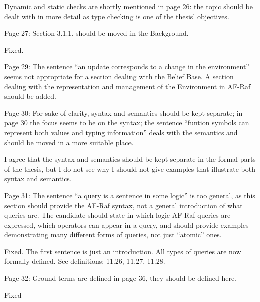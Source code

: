 \documentclass{article}
\newcommand{\todo}[1]{[\textcolor{red}{TODO}: #1]}
\newenvironment{them}{\noindent\begingroup\color{blue}}{\endgroup\par}
\begin{document}
\begin{them}

Dynamic and static checks are shortly mentioned in page 26: the topic should be
dealt with in more detail as type checking is one of the thesis' objectives.

\end{them}
\todo{}

\begin{them}

Page 27:
Section 3.1.1. should be moved in the Background.
\end{them}
Fixed. 

\begin{them}

Page 29:
The sentence “an update corresponds to a change in the environment” seems not
appropriate for a section dealing with the Belief Base. A section dealing with
the representation and management of the Environment in AF-Raf should be added.

\end{them}
\todo{}

\begin{them}

Page 30:
For sake of clarity, syntax and semantics should be kept separate; in page 30
the focus seems to be on the syntax; the sentence “funtion symbols can
represent both values and typing information” deals with the semantics and
should be moved in a more suitable place.

\end{them}
I agree that the syntax and semantics should be kept separate in the formal
parts of the thesis, but I do not see why I should not give examples that
illustrate both syntax and semantics.

\begin{them}

Page 31:
The sentence “a query is a sentence in some logic” is too general, as this
section should provide the AF-Raf syntax, not a general introduction of what
queries are. The candidate should state in which logic AF-Raf queries are
expressed, which operators can appear in a query, and should provide examples
demonstrating many different forms of queries, not just “atomic” ones.

\end{them}
Fixed. The first sentence is just an introduction. All types of queries are now
formally defined. See definitions: 11.26, 11.27, 11.28.

\begin{them}

Page 32:
Ground terms are defined in page 36, they should be defined here.
\end{them}
Fixed
\end{document}
